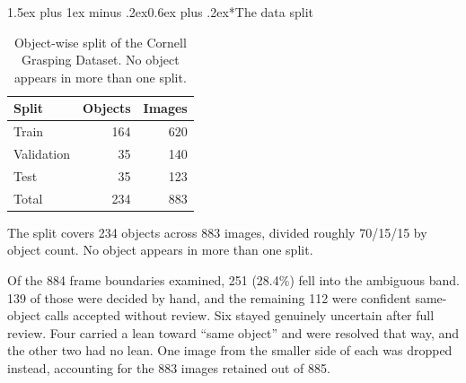 \documentclass[12pt,letterpaper]{article}
\makeatletter
\renewcommand{\subsection}{\@startsection{subsection}{2}{0pt}%
  {1.5ex plus 1ex minus .2ex}{0.6ex plus .2ex}{\normalsize\itshape}}
\makeatother
\begin{document}
\subsection*{The data split}

\begin{table}[H]
\centering
\caption{Object-wise split of the Cornell Grasping Dataset. No object
appears in more than one split.}
\label{tab:split}
\begin{tabular}{lrr}
\toprule
Split & Objects & Images \\
\midrule
Train      & 164 & 620 \\
Validation &  35 & 140 \\
Test       &  35 & 123 \\
\midrule
Total      & 234 & 883 \\
\bottomrule
\end{tabular}
\end{table}

The split covers 234 objects across 883 images, divided roughly 70/15/15
by object count. No object appears in more than one split.

Of the 884 frame boundaries examined, 251 (28.4\%) fell into the
ambiguous band. 139 of those were decided by hand, and the remaining
112 were confident same-object calls accepted without review. Six
stayed genuinely uncertain after full review. Four carried a lean
toward ``same object'' and were resolved that way, and the other two had
no lean. One image from the smaller side of each was dropped instead,
accounting for the 883 images retained out of 885.
\end{document}
